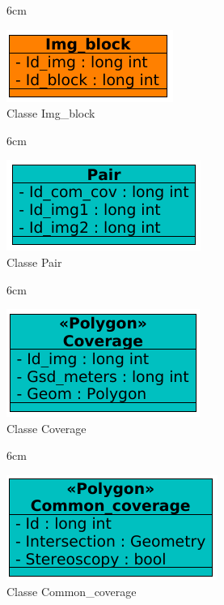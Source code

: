 \begin{figure}[!ht]{6cm}
  \caption{Classe Img\_block} \label{imgblo}
  \centering
  \includegraphics[width=0.7\hsize]{figuras/20.png}
\end{figure}

\begin{figure}[!ht]{6cm}
  \caption{Classe Pair} \label{pair}
  \centering
  \includegraphics[width=0.75\hsize]{figuras/8.png}
\end{figure}

\begin{figure}[!ht]{6cm}
  \caption{Classe Coverage} \label{comm}
  \centering
  \includegraphics[width=0.75\hsize]{figuras/5.png}
\end{figure}

\begin{figure}[!ht]{6cm}
  \caption{Classe Common\_coverage} \label{comcov}
  \centering
  \includegraphics[width=0.85\hsize]{figuras/9.png}
\end{figure}

